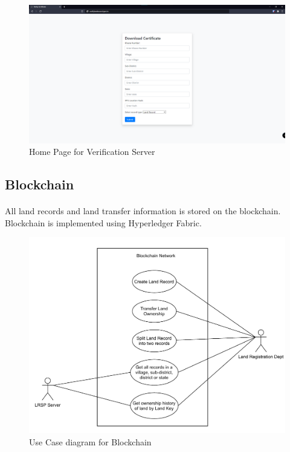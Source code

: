 \documentclass{article}
\begin{document}
        \begin{figure}[H]
                \includegraphics[scale=0.25]{verification_home.png}
                \centering
                \caption{Home Page for Verification Server}
        \end{figure}

    \subsection{Blockchain}
        \paragraph{}
        All land records and land transfer information is stored on the blockchain. Blockchain is implemented using Hyperledger Fabric.

        \begin{figure}[htbp]
            \includegraphics[scale=0.25]{blockchain_use_cases}
            \centering
            \caption{Use Case diagram for Blockchain}
            \label{fig:bl_use_case}
        \end{figure}
\end{document}
